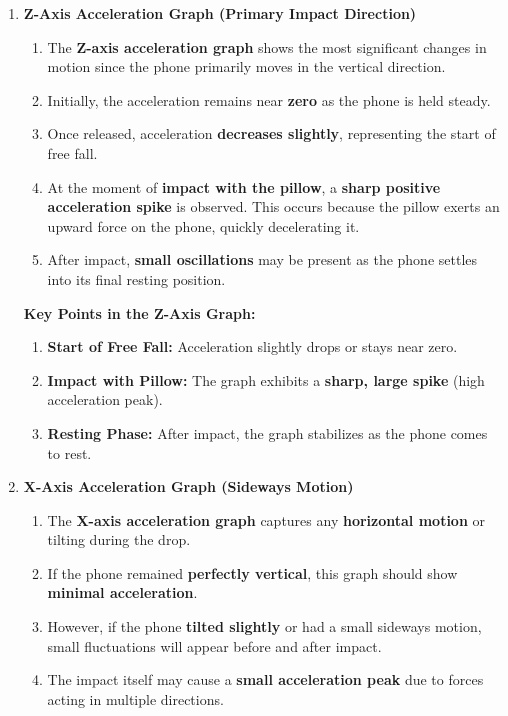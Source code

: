 \documentclass[idxtotoc,hyperref,openany]{labbook} %
\begin{document}
\begin{enumerate}
    \item \textbf{Z-Axis Acceleration Graph (Primary Impact Direction)}
    \begin{enumerate}[$\bullet$]
        \item The \textbf{Z-axis acceleration graph} shows the most significant changes in motion since the phone primarily moves in the vertical direction.
        \item Initially, the acceleration remains near \textbf{zero} as the phone is held steady.
        \item Once released, acceleration \textbf{decreases slightly}, representing the start of free fall.
        \item At the moment of \textbf{impact with the pillow}, a \textbf{sharp positive acceleration spike} is observed. This occurs because the pillow exerts an upward force on the phone, quickly decelerating it.
        \item After impact, \textbf{small oscillations} may be present as the phone settles into its final resting position.
    \end{enumerate}
    \textbf{Key Points in the Z-Axis Graph:}
    \begin{enumerate}[$\bullet$]
        \item \textbf{Start of Free Fall:} Acceleration slightly drops or stays near zero.
        \item \textbf{Impact with Pillow:} The graph exhibits a \textbf{sharp, large spike} (high acceleration peak).
        \item \textbf{Resting Phase:} After impact, the graph stabilizes as the phone comes to rest.
    \end{enumerate}
    \item \textbf{X-Axis Acceleration Graph (Sideways Motion)}
    \begin{enumerate}[$\bullet$]
        \item The \textbf{X-axis acceleration graph} captures any \textbf{horizontal motion} or tilting during the drop.
        \item If the phone remained \textbf{perfectly vertical}, this graph should show \textbf{minimal acceleration}.
        \item However, if the phone \textbf{tilted slightly} or had a small sideways motion, small fluctuations will appear before and after 
        impact.
        \item The impact itself may cause a \textbf{small acceleration peak} due to forces acting in multiple directions.

\end{enumerate}
\end{enumerate}
\end{document}
